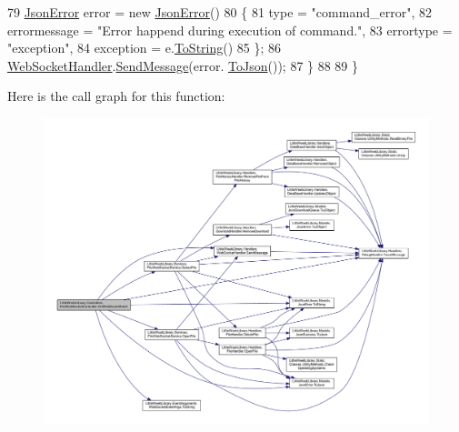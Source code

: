 \begin{DoxyCode}
79                 \mbox{\hyperlink{class_little_weeb_library_1_1_models_1_1_json_error}{JsonError}} error = \textcolor{keyword}{new} \mbox{\hyperlink{class_little_weeb_library_1_1_models_1_1_json_error}{JsonError}}()
80                 \{
81                     type = \textcolor{stringliteral}{"command\_error"},
82                     errormessage = \textcolor{stringliteral}{"Error happend during execution of command."},
83                     errortype = \textcolor{stringliteral}{"exception"},
84                     exception = e.\mbox{\hyperlink{class_little_weeb_library_1_1_models_1_1_json_error_ad7d5522c90119111d2e929f39e7f6d3c}{ToString}}()
85                 \};
86                 \mbox{\hyperlink{class_little_weeb_library_1_1_handlers_1_1_web_socket_handler}{WebSocketHandler}}.\mbox{\hyperlink{class_little_weeb_library_1_1_handlers_1_1_web_socket_handler_a1de289d54d665a32c93478c68d3e6ad0}{SendMessage}}(error.
      \mbox{\hyperlink{class_little_weeb_library_1_1_models_1_1_json_error_a0e3e7dd2e2990404b7f0461742b23440}{ToJson}}());
87             \}
88 
89         \}
\end{DoxyCode}
Here is the call graph for this function\+:\nopagebreak
\begin{figure}[H]
\begin{center}
\leavevmode
\includegraphics[width=350pt]{class_little_weeb_library_1_1_controllers_1_1_file_web_socket_controller_a9ecdec41f15ac23a56c402ff2c554a08_cgraph}
\end{center}
\end{figure}


